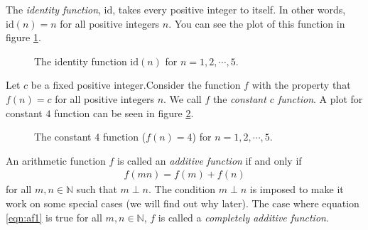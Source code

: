 \documentclass[12pt]{subfile}
\begin{document}
		\begin{definition}
			The \textit{identity function}, $\text{id}$, takes every positive integer to itself. In other words, $\text{id}(n)=n$ for all positive integers $n$. You can see the plot of this function in figure \ref{fig:identityfunction}.

			\begin{figure}
				\centering
				\caption{The identity function $\text{id}(n)$ for $n=1,2,\cdots,5$.}
				\label{fig:identityfunction}
			\end{figure}

		\end{definition}

		\begin{definition}
			Let $c$ be a fixed positive integer.Consider the function $f$ with the property that $f(n)=c$ for all positive integers $n$. We call $f$ the \textit{constant $c$ function}. A plot for constant $4$ function can be seen in figure \ref{fig:constantfunction}.

			\begin{figure}
				\centering
				\caption{The constant $4$ function ($f(n)=4$) for $n=1,2,\cdots,5$.}
				\label{fig:constantfunction}
			\end{figure}
		\end{definition}
		\begin{definition}
			An arithmetic function $f$ is called an \textit{additive function} if and only if
				\begin{align}
					f(mn)=f(m)+f(n)\label{eqn:af1}
				\end{align}
			for all $m,n\in\mathbb{N}$ such that $m\perp n$. The condition $m\perp n$ is imposed to make it work on some special cases (we will find out why later). The case where equation \ref{eqn:af1} is true for all $m,n\in\mathbb{N}$, $f$ is called a \textit{completely additive function}.
		\end{definition}
\end{document}
